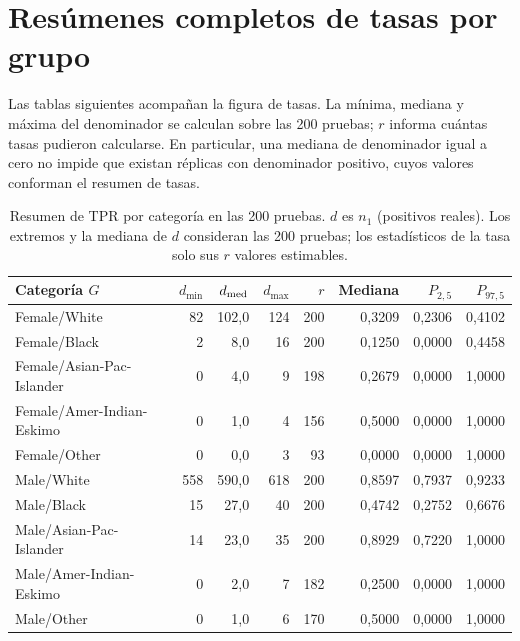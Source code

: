 \documentclass[11pt,a4paper]{article}
\begin{document}
\clearpage
\section{Resúmenes completos de tasas por grupo}
Las tablas siguientes acompañan la figura de tasas. La mínima, mediana y máxima del denominador se calculan sobre las 200 pruebas; $r$ informa cuántas tasas pudieron calcularse. En particular, una mediana de denominador igual a cero no impide que existan réplicas con denominador positivo, cuyos valores conforman el resumen de tasas.

\begin{table}[H]
\centering
\caption[Resumen de TPR por categoría en las 200 pruebas.]{Resumen de TPR por categoría en las 200 pruebas. $d$ es $n_1$ (positivos reales). Los extremos y la mediana de $d$ consideran las 200 pruebas; los estadísticos de la tasa solo sus $r$ valores estimables.}\label{tab:resumenTPR}
\small
\setlength{\tabcolsep}{4pt}
\begin{tabular}{lrrrrrrr}
\toprule
Categoría $G$ & $d_{\min}$ & $d_{\rm med}$ & $d_{\max}$ & $r$ & Mediana & $P_{2,5}$ & $P_{97,5}$ \\
\midrule
Female/White & 82 & 102,0 & 124 & 200 & 0,3209 & 0,2306 & 0,4102 \\
Female/Black & 2 & 8,0 & 16 & 200 & 0,1250 & 0,0000 & 0,4458 \\
Female/Asian-Pac-Islander & 0 & 4,0 & 9 & 198 & 0,2679 & 0,0000 & 1,0000 \\
Female/Amer-Indian-Eskimo & 0 & 1,0 & 4 & 156 & 0,5000 & 0,0000 & 1,0000 \\
Female/Other & 0 & 0,0 & 3 & 93 & 0,0000 & 0,0000 & 1,0000 \\
Male/White & 558 & 590,0 & 618 & 200 & 0,8597 & 0,7937 & 0,9233 \\
Male/Black & 15 & 27,0 & 40 & 200 & 0,4742 & 0,2752 & 0,6676 \\
Male/Asian-Pac-Islander & 14 & 23,0 & 35 & 200 & 0,8929 & 0,7220 & 1,0000 \\
Male/Amer-Indian-Eskimo & 0 & 2,0 & 7 & 182 & 0,2500 & 0,0000 & 1,0000 \\
Male/Other & 0 & 1,0 & 6 & 170 & 0,5000 & 0,0000 & 1,0000 \\
\bottomrule
\end{tabular}
\end{table}
\end{document}
